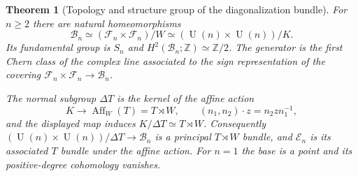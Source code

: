 \documentclass[10pt,a4paper]{amsart}
\newtheorem{theorem}{Theorem}
\newcommand{\U}{\operatorname{U}}
\newcommand{\Z}{\mathbb Z}
\begin{document}
\begin{theorem}[Topology and structure group of the diagonalization bundle]
\label{thm:diagonalization-base}
For $n\geq2$ there are natural homeomorphisms
\[
 \mathcal B_n\simeq(\mathcal F_n\times\mathcal F_n)/W
 \simeq(\U(n)\times\U(n))/K.
\]
Its fundamental group is $S_n$ and
$H^2(\mathcal B_n;\Z)\simeq\Z/2$.
The generator is the first Chern class of the complex line associated
to the sign representation of the covering
$\mathcal F_n\times\mathcal F_n\to\mathcal B_n$.

The normal subgroup $\Delta T$ is the kernel of the affine action
\[
 K\longrightarrow\operatorname{Aff}_W(T)=T\rtimes W,
 \qquad (n_1,n_2)\cdot z=n_2zn_1^{-1},
\]
and the displayed map induces $K/\Delta T\simeq T\rtimes W$.
Consequently $(\U(n)\times\U(n))/\Delta T\to\mathcal B_n$
is a principal $T\rtimes W$ bundle, and $\mathcal E_n$ is its
associated $T$ bundle under the affine action. For $n=1$ the base is a
point and its positive-degree cohomology vanishes.
\end{theorem}
\end{document}
